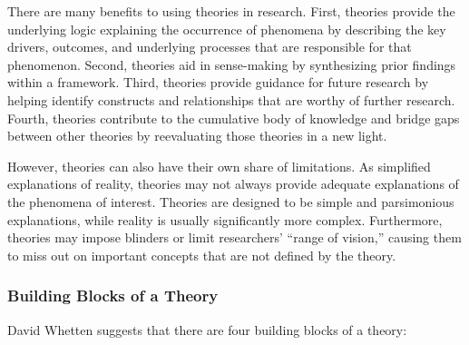 There are many benefits to using theories in research. First, theories provide the underlying logic explaining the occurrence of phenomena by describing the key drivers, outcomes, and underlying processes that are responsible for that phenomenon. Second, theories aid in sense-making by synthesizing prior findings within a framework. Third, theories provide guidance for future research by helping identify constructs and relationships that are worthy of further research. Fourth, theories contribute to the cumulative body of knowledge and bridge gaps between other theories by reevaluating those theories in a new light.

However, theories can also have their own share of limitations. As simplified explanations of reality, theories may not always provide adequate explanations of the phenomena of interest. Theories are designed to be simple and parsimonious explanations, while reality is usually significantly more complex. Furthermore, theories may impose blinders or limit researchers' ``range of vision,'' causing them to miss out on important concepts that are not defined by the theory.

\subsubsection{Building Blocks of a Theory}

David Whetten\cite{whetten1989constitutes} suggests that there are four building blocks of a theory:

